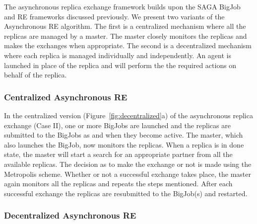 \documentclass[a4paper,10pt]{article}
\newcommand{\alnote}[1]{ {\textcolor{blue} { ***andre: #1 }}}
\newcommand{\alnote}[1]{}
\begin{document}

The asynchronous replica exchange framework builds upon the SAGA BigJob and RE frameworks discussed previously.
We present two variants of the Asynchronous RE algorithm. The first is a centralized 
mechanism where all the replicas are managed by a master. The master closely monitors the replicas and makes the exchanges when appropriate. 
The second is a decentralized mechanism where each replica is managed individually and independently. An agent is launched in place of the replica and will perform the the required actions on behalf of the replica.


\subsubsection{Centralized Asynchronous RE}



In the centralized version (Figure~\ref{fig:decentralized}a) of the
asynchronous replica exchange (Case II), one or more BigJobs are
launched and the replicas are submitted to the BigJobs as and when
they become active. The master, which also launches the BigJob, now
monitors the replicas. When a replica is in done state, the master
will start a search for an appropriate partner from all the available
replicas. The decision as to make the exchange or not is made using
the Metropolis scheme.  Whether or not a successful exchange takes
place, the master again monitors all the replicas and repeats the
steps mentioned.  After each successful exchange the replicas are
resubmitted to the BigJob(s) and restarted.

\subsubsection{Decentralized Asynchronous RE}
\end{document}
